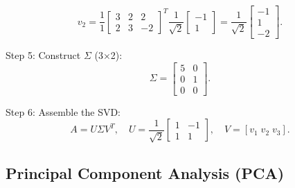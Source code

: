 \documentclass{article}
\begin{document}
\begin{enumerate}
\[
v_2 = \frac{1}{1}
\begin{bmatrix}
3 & 2 & 2\\
2 & 3 & -2
\end{bmatrix}^T
\frac{1}{\sqrt{2}}
\begin{bmatrix}-1\\1\end{bmatrix}
=
\frac{1}{\sqrt{2}}
\begin{bmatrix}-1\\1\\-2\end{bmatrix}.
\]

Step 5: Construct $\Sigma$ (3×2):
\[
\Sigma =
\begin{bmatrix}
5 & 0 \\
0 & 1 \\
0 & 0
\end{bmatrix}.
\]

Step 6: Assemble the SVD:
\[
A = U \Sigma V^T, \quad
U = 
\frac{1}{\sqrt{2}}
\begin{bmatrix}1 & -1\\ 1 & 1\end{bmatrix}, \quad
V = [v_1 \; v_2 \; v_3].
\]
\end{enumerate}


\subsection*{Principal Component Analysis (PCA)}
\end{document}
